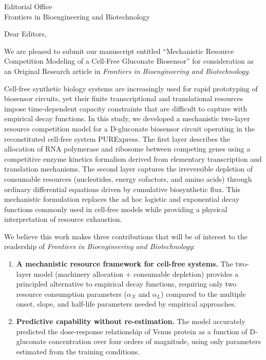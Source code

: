\documentclass[11pt]{letter}
\begin{document}
\begin{letter}{Editorial Office\\Frontiers in Bioengineering and Biotechnology}

\opening{Dear Editors,}

We are pleased to submit our manuscript entitled ``Mechanistic Resource Competition Modeling of a Cell-Free Gluconate Biosensor'' for consideration as an Original Research article in \textit{Frontiers in Bioengineering and Biotechnology}.

Cell-free synthetic biology systems are increasingly used for rapid prototyping of biosensor circuits, yet their finite transcriptional and translational resources impose time-dependent capacity constraints that are difficult to capture with empirical decay functions. In this study, we developed a mechanistic two-layer resource competition model for a D-gluconate biosensor circuit operating in the reconstituted cell-free system PURExpress. The first layer describes the allocation of RNA polymerase and ribosome between competing genes using a competitive enzyme kinetics formalism derived from elementary transcription and translation mechanisms. The second layer captures the irreversible depletion of consumable resources (nucleotides, energy cofactors, and amino acids) through ordinary differential equations driven by cumulative biosynthetic flux. This mechanistic formulation replaces the ad hoc logistic and exponential decay functions commonly used in cell-free models while providing a physical interpretation of resource exhaustion.

We believe this work makes three contributions that will be of interest to the readership of \textit{Frontiers in Bioengineering and Biotechnology}:

\begin{enumerate}
\item \textbf{A mechanistic resource framework for cell-free systems.} The two-layer model (machinery allocation + consumable depletion) provides a principled alternative to empirical decay functions, requiring only two resource consumption parameters ($\alpha_X$ and $\alpha_L$) compared to the multiple onset, slope, and half-life parameters needed by empirical approaches.

\item \textbf{Predictive capability without re-estimation.} The model accurately predicted the dose-response relationship of Venus protein as a function of D-gluconate concentration over four orders of magnitude, using only parameters estimated from the training conditions.


\end{enumerate}
\end{letter}
\end{document}
